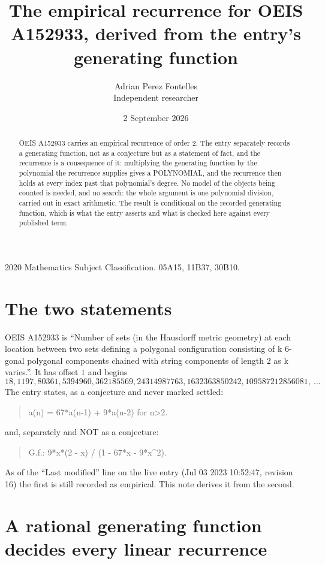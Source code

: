 \documentclass[11pt,a4paper]{article}
\title{The empirical recurrence for OEIS A152933, derived from the entry's generating function}
\author{Adrian Perez Fontelles\\ \small Independent researcher}
\date{2 September 2026}
\theoremstyle{plain}
\theoremstyle{definition}
\begin{document}
\maketitle

\begin{abstract}
OEIS A152933 carries an empirical recurrence of order $2$. The entry separately records a
generating function, not as a conjecture but as a statement of fact, and the recurrence is a
consequence of it: multiplying the generating function by the polynomial the recurrence
supplies gives a POLYNOMIAL, and the recurrence then holds at every index past that
polynomial's degree. No model of the objects being counted is needed, and no search: the
whole argument is one polynomial division, carried out in exact arithmetic. The result is
conditional on the recorded generating function, which is what the entry asserts and what is
checked here against every published term.
\end{abstract}

\noindent\small 2020 Mathematics Subject Classification. 05A15, 11B37, 30B10.\normalsize

\section{The two statements}

OEIS A152933 is ``Number of sets (in the Hausdorff metric geometry) at each location between two sets defining a polygonal configuration consisting of k 6-gonal polygonal components chained with string components of length 2 as k varies.''. It has offset $1$ and begins
\[
18, 1197, 80361, 5394960, 362185569, 24314987763, 1632363850242, 109587212856081,\ \dots
\]
The entry states, as a conjecture and never marked settled:
\begin{quote}
a(n) = 67*a(n-1) + 9*a(n-2) for n>2.
\end{quote}
and, separately and NOT as a conjecture:
\begin{quote}
G.f.: 9*x*(2 - x) / (1 - 67*x - 9*x\^{}2).
\end{quote}
As of the ``Last modified'' line on the live entry (Jul 03 2023 10:52:47, revision 16) the first is still
recorded as empirical. This note derives it from the second.

\section{A rational generating function decides every linear recurrence}
\end{document}

